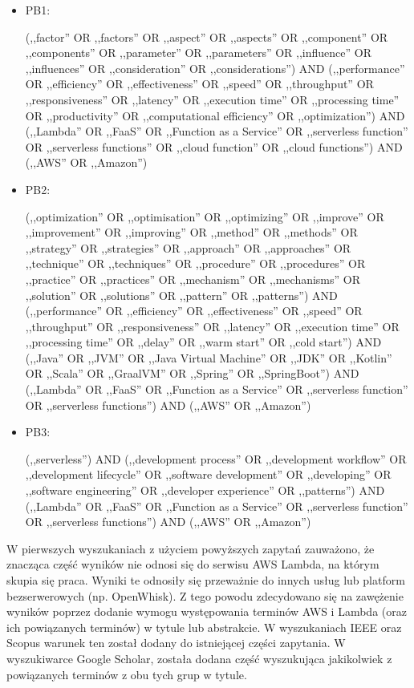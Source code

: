 \begin{itemize}
    \item PB1:

    (,,factor'' OR ,,factors'' OR ,,aspect'' OR ,,aspects'' OR ,,component'' OR ,,components'' OR ,,parameter'' OR ,,parameters'' OR ,,influence'' OR ,,influences'' OR ,,consideration'' OR ,,considerations'') 
    AND (,,performance'' OR ,,efficiency'' OR ,,effectiveness'' OR ,,speed'' OR ,,throughput'' OR ,,responsiveness'' OR ,,latency'' OR ,,execution time'' OR ,,processing time'' OR ,,productivity'' OR ,,computational efficiency'' OR ,,optimization'') 
    AND (,,Lambda'' OR ,,FaaS'' OR ,,Function as a Service'' OR ,,serverless function'' OR ,,serverless functions'' OR ,,cloud function'' OR ,,cloud functions'')
    AND (,,AWS'' OR ,,Amazon'')

    \item PB2:
    
    (,,optimization'' OR ,,optimisation'' OR ,,optimizing'' OR ,,improve'' OR ,,improvement'' OR ,,improving'' OR ,,method'' OR ,,methods'' OR ,,strategy'' OR ,,strategies'' OR ,,approach'' OR ,,approaches'' OR ,,technique'' OR ,,techniques'' OR ,,procedure'' OR ,,procedures'' OR ,,practice'' OR ,,practices'' OR ,,mechanism'' OR ,,mechanisms'' OR ,,solution'' OR ,,solutions'' OR ,,pattern'' OR ,,patterns'')
    AND (,,performance'' OR ,,efficiency'' OR ,,effectiveness'' OR ,,speed'' OR ,,throughput'' OR ,,responsiveness'' OR ,,latency'' OR ,,execution time'' OR ,,processing time'' OR ,,delay'' OR ,,warm start'' OR ,,cold start'')
    AND (,,Java'' OR ,,JVM'' OR ,,Java Virtual Machine'' OR ,,JDK'' OR ,,Kotlin'' OR ,,Scala'' OR ,,GraalVM'' OR ,,Spring'' OR ,,SpringBoot'')
    AND (,,Lambda'' OR ,,FaaS'' OR ,,Function as a Service'' OR ,,serverless function'' OR ,,serverless functions'')
    AND (,,AWS'' OR ,,Amazon'')

    \item PB3:
    
    (,,serverless'') 
    AND (,,development process'' OR ,,development workflow'' OR ,,development lifecycle'' OR ,,software development'' OR ,,developing'' OR ,,software engineering'' OR ,,developer experience'' OR ,,patterns'') 
    AND (,,Lambda'' OR ,,FaaS'' OR ,,Function as a Service'' OR ,,serverless function'' OR ,,serverless functions'') 
    AND (,,AWS'' OR ,,Amazon'')
    
\end{itemize}

W pierwszych wyszukaniach z użyciem powyższych zapytań zauważono, że znacząca część wyników nie odnosi się do serwisu AWS Lambda, na którym skupia się praca.
Wyniki te odnosiły się przeważnie do innych usług lub platform bezserwerowych (np. OpenWhisk).
Z tego powodu zdecydowano się na zawężenie wyników poprzez dodanie wymogu występowania terminów AWS i Lambda (oraz ich powiązanych terminów) w tytule lub abstrakcie.
W wyszukaniach IEEE oraz Scopus warunek ten został dodany do istniejącej części zapytania. 
W wyszukiwarce Google Scholar, została dodana część wyszukująca jakikolwiek z powiązanych terminów z obu tych grup w tytule. 

